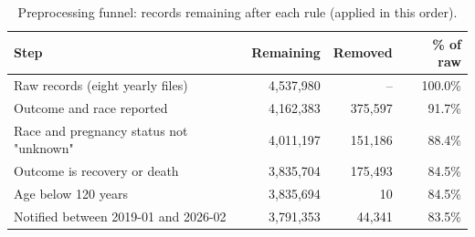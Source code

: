 \begin{table}
  \small
  \caption{Preprocessing funnel: records remaining after each rule (applied in this order).}
  \label{tab:preprocessing-funnel}
  \begin{tabular}{lrrr}
    \toprule
    Step & Remaining & Removed & \% of raw \\
    \midrule
    Raw records (eight yearly files) & 4,537,980 & -- & 100.0\% \\
    Outcome and race reported & 4,162,383 & 375,597 & 91.7\% \\
    Race and pregnancy status not "unknown" & 4,011,197 & 151,186 & 88.4\% \\
    Outcome is recovery or death & 3,835,704 & 175,493 & 84.5\% \\
    Age below 120 years & 3,835,694 & 10 & 84.5\% \\
    Notified between 2019-01 and 2026-02 & 3,791,353 & 44,341 & 83.5\% \\
    \bottomrule
  \end{tabular}
\end{table}
